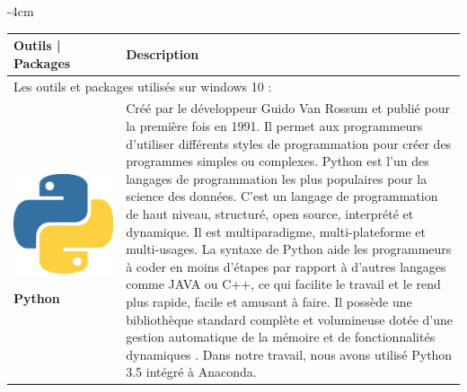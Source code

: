 \begin{table}[H]
	\centering
	\addtolength{\leftskip} {-4cm}
	\addtolength{\rightskip}{-4.5cm}
	\begin{tabular}{|m{5cm}|m{12cm}|}
	\hline
	\rowcolor{blueforest}
	\color{white} \textbf{Outils | Packages} & \color{white} \textbf{Description}  \\
	\hline\hline
	\multicolumn{2}{|m{17cm}|}{\centering Les outils et packages utilisés sur windows 10 : }\\ \hline
	\begin{center}
	    \begin{minipage}{.3\textwidth}
      \includegraphics[width=\textwidth]{images/chapitre7/python.png}
    \end{minipage}
	\end{center}
	\centering \textbf{Python} \cite{10.5555/1593511} & Créé par le développeur Guido Van Rossum et publié pour la première fois en 1991. Il permet aux programmeurs d'utiliser différents styles de programmation pour créer des programmes simples ou complexes. Python est l'un des langages de programmation les plus populaires pour la science des données. C'est un langage de programmation de haut niveau, structuré, open source, interprété et dynamique. Il est multiparadigme, multi-plateforme et multi-usages. La syntaxe de Python aide les programmeurs à coder en moins d'étapes par rapport à d'autres langages comme JAVA ou C++, ce qui facilite le travail et le rend plus rapide, facile et amusant à faire. Il possède une bibliothèque standard complète et volumineuse dotée d'une gestion automatique de la mémoire et de fonctionnalités dynamiques \cite{python_cours}. Dans notre travail, nous avons utilisé Python 3.5 intégré à Anaconda. \\ \hline

\end{tabular}
\end{table}
